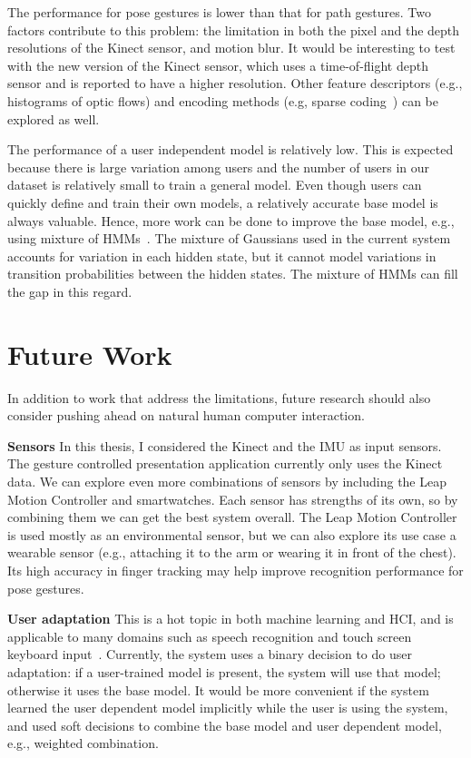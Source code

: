 The performance for pose gestures is lower than that
for path gestures. Two factors contribute to this problem: the limitation in
both the pixel and the depth resolutions of the Kinect sensor, and motion blur.
It would be interesting to test with the new version of the Kinect sensor, which
uses a time-of-flight depth sensor and is reported to have a higher resolution. Other feature descriptors
(e.g., histograms of optic flows) and encoding methods (e.g, sparse
coding~\cite{lee07}) can be explored as well.

The performance of a user independent model is relatively low. This is expected
because there is large variation among users and the number of users in our
dataset is relatively small to train a general model.
Even though users can quickly define and train their own models, a relatively
accurate base model is always valuable. Hence, more work can be done to improve the base
model, e.g., using mixture of HMMs~\cite{keskin12}. The mixture of Gaussians
used in the current system accounts for variation in each hidden state, but it
cannot model variations in transition probabilities between the hidden states.
The mixture of HMMs can fill the gap in this regard.

\section{Future Work}
In addition to work that address the limitations, future research should also
consider pushing ahead on natural human computer interaction.

\textbf{Sensors} In this thesis, I considered the Kinect and the IMU as
input sensors. The gesture controlled presentation application currently
only uses the Kinect data. We can explore even more combinations of sensors
by including the Leap Motion Controller and smartwatches. Each sensor has
strengths of its own, so by combining them we can get the best system
overall. The Leap Motion Controller is used mostly as an environmental sensor,
but we can also explore its use case a wearable sensor (e.g., attaching it to
the arm or wearing it in front of the chest).
Its high accuracy in finger tracking may help improve recognition performance for pose gestures.

\textbf{User adaptation} This is a hot topic in both machine learning and
HCI, and is applicable to many domains such as speech recognition and
touch screen keyboard input~\cite{yin13-making}. Currently, the system
uses a binary decision to do user adaptation: if a user-trained model is
present, the system will use that model; otherwise it uses the base
model. It would be more convenient if the system learned the user
dependent model implicitly while the user is using the system, and used
soft decisions to combine the base model and user dependent model, e.g.,
weighted combination.

